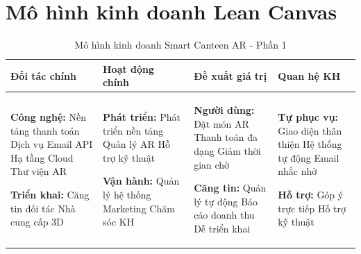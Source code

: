 \documentclass[12pt,a4paper]{article}
\begin{document}
\section{Mô hình kinh doanh Lean Canvas}

\begin{table}[H]
\centering
\caption{Mô hình kinh doanh Smart Canteen AR - Phần 1}
\label{tab:lean-canvas-1}
\begin{tabular}{|p{3cm}|p{3cm}|p{3cm}|p{3cm}|}
\hline
\textbf{Đối tác chính} & \textbf{Hoạt động chính} & \textbf{Đề xuất giá trị} & \textbf{Quan hệ KH} \\
\hline
\textbf{Công nghệ:}
\newline \textbullet{} Nền tảng thanh toán
\newline \textbullet{} Dịch vụ Email API
\newline \textbullet{} Hạ tầng Cloud
\newline \textbullet{} Thư viện AR

\textbf{Triển khai:}
\newline \textbullet{} Căng tin đối tác
\newline \textbullet{} Nhà cung cấp 3D &

\textbf{Phát triển:}
\newline \textbullet{} Phát triển nền tảng
\newline \textbullet{} Quản lý AR
\newline \textbullet{} Hỗ trợ kỹ thuật

\textbf{Vận hành:}
\newline \textbullet{} Quản lý hệ thống
\newline \textbullet{} Marketing
\newline \textbullet{} Chăm sóc KH &

\textbf{Người dùng:}
\newline \textbullet{} Đặt món AR
\newline \textbullet{} Thanh toán đa dạng
\newline \textbullet{} Giảm thời gian chờ

\textbf{Căng tin:}
\newline \textbullet{} Quản lý tự động
\newline \textbullet{} Báo cáo doanh thu
\newline \textbullet{} Dễ triển khai &

\textbf{Tự phục vụ:}
\newline \textbullet{} Giao diện thân thiện
\newline \textbullet{} Hệ thống tự động
\newline \textbullet{} Email nhắc nhở

\textbf{Hỗ trợ:}
\newline \textbullet{} Góp ý trực tiếp
\newline \textbullet{} Hỗ trợ kỹ thuật \\
\hline
\end{tabular}
\end{table}
\end{document}
